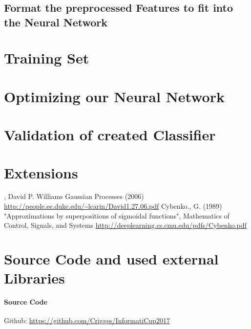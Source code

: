 \documentclass[paper=A4,pagesize=auto,13pt,headinclude=true,footinclude=true,BCOR=0mm,DIV=calc]{scrartcl}
\begin{document}
\subsection{Format the preprocessed Features to fit into the Neural Network}
	
	
	\section{Training Set}
	
	\section{Optimizing our Neural Network }

	
	\section{Validation of created Classifier}
	
	\section{Extensions}
	
	
	
	\newpage
	
	\begin{thebibliography}{xxxxxx}
		 , David P. Williams Gaussian Processes (2006) \url{http://people.ee.duke.edu/~lcarin/David1.27.06.pdf}
		  Cybenko., G. (1989) "Approximations by superpositions of sigmoidal functions", Mathematics of Control, Signals, and Systems \url{http://deeplearning.cs.cmu.edu/pdfs/Cybenko.pdf}
	\end{thebibliography}
	
	
	\section{Source Code and used external Libraries}
	\paragraph{Source Code}
	Github: \url{https://github.com/Crigges/InformatiCup2017}\\
\end{document}
